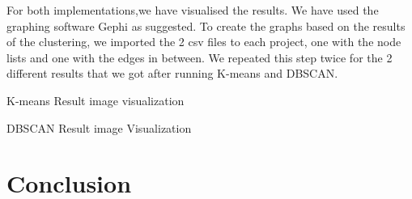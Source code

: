 \documentclass{article}
\begin{document}
For both implementations,we have visualised the results. We have used the graphing software Gephi as suggested.
To create the graphs based on the results of the clustering, we imported the 2 csv files to each project, one with the node lists and one with the edges in between. 
We repeated this step twice for the 2 different results that we got after running 
K-means and DBSCAN.

K-means Result image visualization

DBSCAN Result image Visualization


    
        \section{Conclusion}



      
    
    
    \nocite{*}
\end{document}
